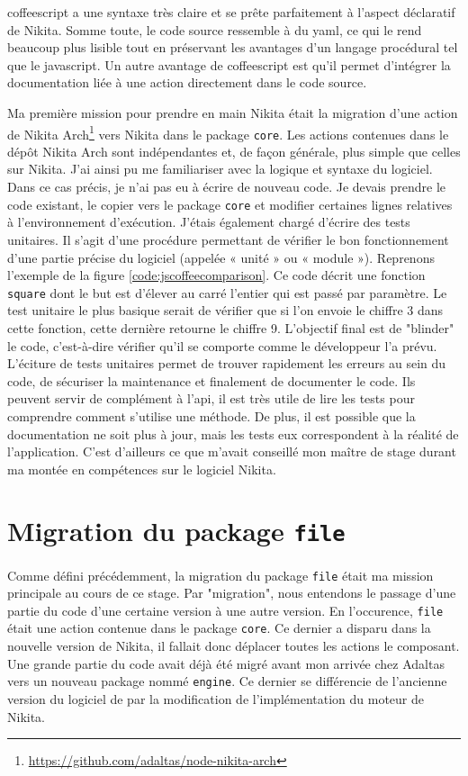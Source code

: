 \documentclass[12pt, french]{report}
\begin{document}
\gls{coffeescript} a une syntaxe très claire et se prête parfaitement à l'aspect déclaratif de Nikita. Somme toute, le code source ressemble à du \gls{yaml}, ce qui le rend beaucoup plus lisible tout en préservant les avantages d'un langage procédural tel que le \gls{javascript}. Un autre avantage de \gls{coffeescript} est qu'il permet d'intégrer la documentation liée à une action directement dans le code source.

Ma première mission pour prendre en main Nikita était la migration d'une action de Nikita Arch\footnote{\href{https://github.com/adaltas/node-nikita-arch}{https://github.com/adaltas/node-nikita-arch}} vers Nikita dans le package \texttt{core}. Les actions contenues dans le dépôt Nikita Arch sont indépendantes et, de façon générale, plus simple que celles sur Nikita. J'ai ainsi pu me familiariser avec la logique et syntaxe du logiciel. Dans ce cas précis, je n'ai pas eu à écrire de nouveau code. Je devais prendre le code existant, le copier vers le package \texttt{core} et modifier certaines lignes relatives à l'environnement d'exécution. J'étais également chargé d'écrire des tests unitaires. Il s'agit d'une procédure permettant de vérifier le bon fonctionnement d'une partie précise du logiciel (appelée « unité » ou « module »). Reprenons l'exemple de la figure \ref{code:jscoffeecomparison}. Ce code décrit une fonction \texttt{square} dont le but est d'élever au carré l'entier qui est passé par paramètre. Le test unitaire le plus basique serait de vérifier que si l'on envoie le chiffre 3 dans cette fonction, cette dernière retourne le chiffre 9. L'objectif final est de "blinder" le code, c'est-à-dire vérifier qu'il se comporte comme le développeur l'a prévu. L'éciture de tests unitaires permet de trouver rapidement les erreurs au sein du code, de sécuriser la maintenance et finalement de documenter le code. Ils peuvent servir de complément à l'\gls{api}, il est très utile de lire les tests pour comprendre comment s'utilise une méthode. De plus, il est possible que la documentation ne soit plus à jour, mais les tests eux correspondent à la réalité de l'application. C'est d'ailleurs ce que m'avait conseillé mon maître de stage durant ma montée en compétences sur le logiciel Nikita.

\section{Migration du package \texttt{file}}

Comme défini précédemment, la migration du package \texttt{file} était ma mission principale au cours de ce stage. Par "migration", nous entendons le passage d'une partie du code d'une certaine version à une autre version. En l'occurence, \texttt{file} était une action contenue dans le package \texttt{core}. Ce dernier a disparu dans la nouvelle version de Nikita, il fallait donc déplacer toutes les actions le composant. Une grande partie du code avait déjà été migré avant mon arrivée chez Adaltas vers un nouveau package nommé \texttt{engine}. Ce dernier se différencie de l'ancienne version du logiciel de par la modification de l'implémentation du moteur de Nikita.
\end{document}
